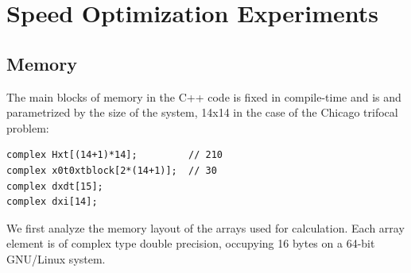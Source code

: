 \section{Speed Optimization Experiments}

\subsection{Memory}
The main blocks of memory in the C++ code is fixed in compile-time and is and
parametrized by the size of the system, 14x14 in the case of the Chicago
trifocal problem:
\begin{verbatim}
complex Hxt[(14+1)*14];         // 210
complex x0t0xtblock[2*(14+1)];  // 30
complex dxdt[15];           
complex dxi[14];
\end{verbatim}
We first analyze the memory layout of the arrays used for calculation. Each
array element is of complex type double precision, occupying 16 bytes on a
64-bit GNU/Linux system.
